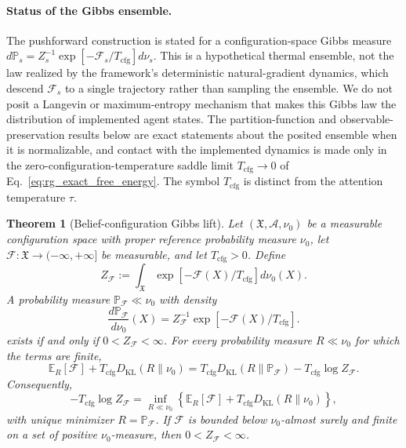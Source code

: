\documentclass[11pt]{article}
\newtheorem{theorem}{Theorem}
\begin{document}
\paragraph{Status of the Gibbs ensemble.}
The pushforward construction is stated for a configuration-space Gibbs measure $d\mathbb{P}_s = Z_s^{-1}\exp[-\mathcal{F}_s/T_{\mathrm{cfg}}]d\nu_s$. This is a hypothetical thermal ensemble, not the law realized by the framework's deterministic natural-gradient dynamics, which descend $\mathcal{F}_s$ to a single trajectory rather than sampling the ensemble. We do not posit a Langevin or maximum-entropy mechanism that makes this Gibbs law the distribution of implemented agent states. The partition-function and observable-preservation results below are exact statements about the posited ensemble when it is normalizable, and contact with the implemented dynamics is made only in the zero-configuration-temperature saddle limit $T_{\mathrm{cfg}}\to0$ of Eq.~\eqref{eq:rg_exact_free_energy}. The symbol $T_{\mathrm{cfg}}$ is distinct from the attention temperature $\tau$.

\begin{theorem}[Belief-configuration Gibbs lift]
\label{thm:belief_configuration_gibbs_lift}
Let $(\mathfrak{X},\mathcal{A},\nu_0)$ be a measurable configuration space with proper reference probability measure $\nu_0$, let $\mathcal{F}:\mathfrak{X}\to(-\infty,+\infty]$ be measurable, and let $T_{\mathrm{cfg}}>0$. Define
\begin{equation}
Z_{\mathcal{F}}
:=\int_{\mathfrak{X}}
\exp[-\mathcal{F}(X)/T_{\mathrm{cfg}}]d\nu_0(X).
\label{eq:belief_configuration_partition}
\end{equation}
A probability measure $\mathbb{P}_{\mathcal{F}}\ll\nu_0$ with density
\begin{equation}
\frac{d\mathbb{P}_{\mathcal{F}}}{d\nu_0}(X)
=Z_{\mathcal{F}}^{-1}
\exp[-\mathcal{F}(X)/T_{\mathrm{cfg}}].
\label{eq:belief_configuration_gibbs_density}
\end{equation}
exists if and only if $0<Z_{\mathcal{F}}<\infty$. For every probability measure $R\ll\nu_0$ for which the terms are finite,
\begin{equation}
\mathbb{E}_{R}[\mathcal{F}]
+T_{\mathrm{cfg}}D_{\mathrm{KL}}(R\|\nu_0)
=T_{\mathrm{cfg}}D_{\mathrm{KL}}(R\|\mathbb{P}_{\mathcal{F}})
-T_{\mathrm{cfg}}\log Z_{\mathcal{F}}.
\label{eq:belief_configuration_vfe_identity}
\end{equation}
Consequently,
\begin{equation}
-T_{\mathrm{cfg}}\log Z_{\mathcal{F}}
=\inf_{R\ll\nu_0}
\left\{
\mathbb{E}_{R}[\mathcal{F}]
+T_{\mathrm{cfg}}D_{\mathrm{KL}}(R\|\nu_0)
\right\},
\label{eq:belief_configuration_gibbs_variational_principle}
\end{equation}
with unique minimizer $R=\mathbb{P}_{\mathcal{F}}$. If $\mathcal{F}$ is bounded below $\nu_0$-almost surely and finite on a set of positive $\nu_0$-measure, then $0<Z_{\mathcal{F}}<\infty$.
\end{theorem}
\end{document}
